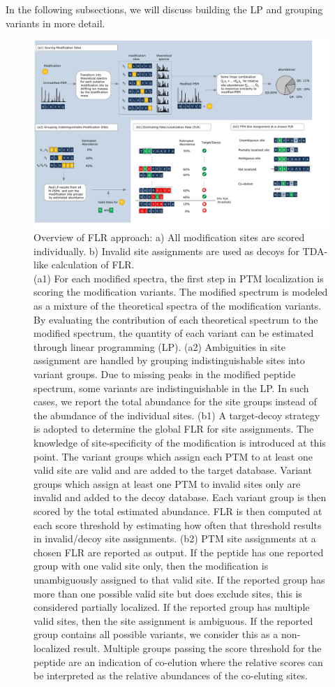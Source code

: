 \documentclass[11pt]{article}
\begin{document}
In the following subsections, we will discuss building the LP and grouping variants in more detail.

\begin{figure}[]
\centering %
\includegraphics[height=0.7\textwidth]{fig/intro.pdf}
\caption{\small Overview of FLR approach: a) All modification sites are scored individually. b) Invalid site assignments are used as decoys for TDA-like calculation of FLR.\\ (a1) For each modified spectra, the first step in PTM localization is scoring the modification variants. The modified spectrum is modeled as a mixture of the theoretical spectra of the modification variants. By evaluating the contribution of each theoretical spectrum to the modified spectrum, the quantity of each variant can be estimated through linear programming (LP). (a2) Ambiguities in site assignment are handled by grouping indistinguishable sites into variant groups. Due to missing peaks in the modified peptide spectrum, some variants are indistinguishable in the LP. In such cases, we report the total abundance for the site groups instead of the abundance of the individual sites. (b1) A target-decoy strategy is adopted to determine the global FLR for site assignments. The knowledge of site-specificity of the modification is introduced at this point. The variant groups which assign each PTM to at least one valid site are valid and are added to the target database. Variant groups which assign at least one PTM to invalid sites only are invalid and added to the decoy database. Each variant group is then scored by the total estimated abundance. FLR is then computed at each score threshold by estimating how often that threshold results in invalid/decoy site assignments. (b2) PTM site assignments at a chosen FLR are reported as output. If the peptide has one reported group with one valid site only, then the modification is unambiguously assigned to that valid site. If the reported group has more than one possible valid site but does exclude sites, this is considered partially localized. If the reported group has multiple valid sites, then the site assignment is ambiguous. If the reported group contains all possible variants, we consider this as a non-localized result. Multiple groups passing the score threshold for the peptide are an indication of co-elution where the relative scores can be interpreted as the relative abundances of the co-eluting sites.}

\end{figure}
\end{document}

